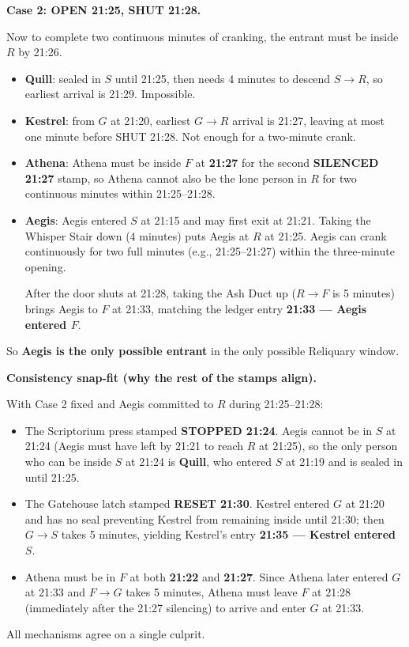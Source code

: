 \medskip

\textbf{Case 2: OPEN 21:25, SHUT 21:28.}


Now to complete two continuous minutes of cranking, the entrant must be inside \(R\) by 21:26.

\begin{itemize}
\item \textbf{Quill}: sealed in \(S\) until 21:25, then needs 4 minutes to descend \(S\to R\), so earliest arrival is 21:29. Impossible.
\item \textbf{Kestrel}: from \(G\) at 21:20, earliest \(G\to R\) arrival is 21:27, leaving at most one minute before SHUT 21:28. Not enough for a two-minute crank.
\item \textbf{Athena}: Athena must be inside \(F\) at \textbf{21:27} for the second \textbf{SILENCED 21:27} stamp, so Athena cannot also be the lone person in \(R\) for two continuous minutes within 21:25--21:28.
\item \textbf{Aegis}: Aegis entered \(S\) at 21:15 and may first exit at 21:21. Taking the Whisper Stair down (4 minutes) puts Aegis at \(R\) at 21:25. Aegis can crank continuously for two full minutes (e.g., 21:25--21:27) within the three-minute opening.

After the door shuts at 21:28, taking the Ash Duct up (\(R\to F\) is 5 minutes) brings Aegis to \(F\) at 21:33, matching the ledger entry \textbf{21:33 --- Aegis entered \(F\)}.
\end{itemize}

So \textbf{Aegis is the only possible entrant} in the only possible Reliquary window.

\medskip

\textbf{Consistency snap-fit (why the rest of the stamps align).}

With Case 2 fixed and Aegis committed to \(R\) during 21:25--21:28:

\begin{itemize}
\item The Scriptorium press stamped \textbf{STOPPED 21:24}. Aegis cannot be in \(S\) at 21:24 (Aegis must have left by 21:21 to reach \(R\) at 21:25), so the only person who can be inside \(S\) at 21:24 is \textbf{Quill}, who entered \(S\) at 21:19 and is sealed in until 21:25.
\item The Gatehouse latch stamped \textbf{RESET 21:30}. Kestrel entered \(G\) at 21:20 and has no seal preventing Kestrel from remaining inside until 21:30; then \(G\to S\) takes 5 minutes, yielding Kestrel’s entry \textbf{21:35 --- Kestrel entered \(S\)}.
\item Athena must be in \(F\) at both \textbf{21:22} and \textbf{21:27}. Since Athena later entered \(G\) at 21:33 and \(F\to G\) takes 5 minutes, Athena must leave \(F\) at 21:28 (immediately after the 21:27 silencing) to arrive and enter \(G\) at 21:33.
\end{itemize}

All mechanisms agree on a single culprit.


\NextPage